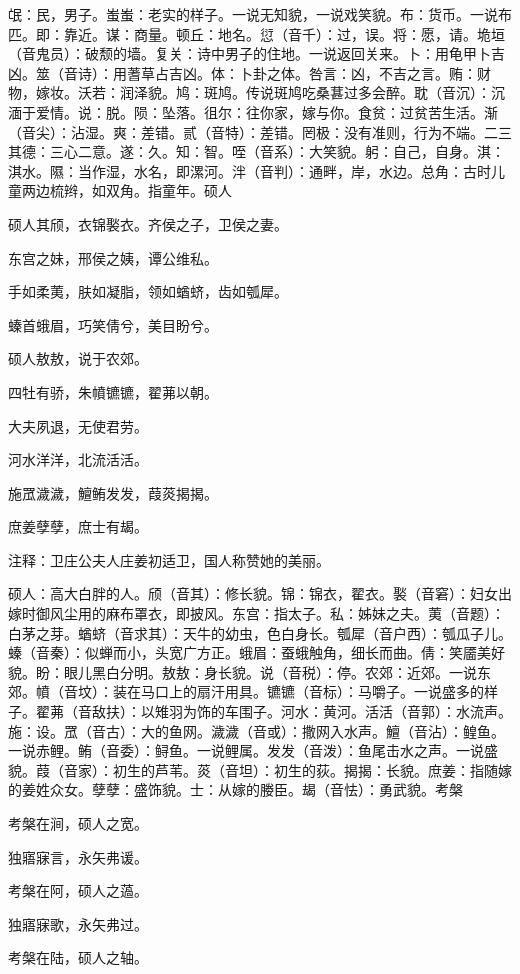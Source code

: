 \documentclass[12pt,UTF8]{ctexbook}
\begin{document}
氓：民，男子。蚩蚩：老实的样子。一说无知貌，一说戏笑貌。布：货币。一说布匹。即：靠近。谋：商量。顿丘：地名。愆（音千）：过，误。将：愿，请。垝垣（音鬼员）：破颓的墙。复关：诗中男子的住地。一说返回关来。卜：用龟甲卜吉凶。筮（音诗）：用蓍草占吉凶。体：卜卦之体。咎言：凶，不吉之言。贿：财物，嫁妆。沃若：润泽貌。鸠：斑鸠。传说斑鸠吃桑葚过多会醉。耽（音沉）：沉湎于爱情。说：脱。陨：坠落。徂尔：往你家，嫁与你。食贫：过贫苦生活。渐（音尖）：沾湿。爽：差错。贰（音特）：差错。罔极：没有准则，行为不端。二三其德：三心二意。遂：久。知：智。咥（音系）：大笑貌。躬：自己，自身。淇：淇水。隰：当作湿，水名，即漯河。泮（音判）：通畔，岸，水边。总角：古时儿童两边梳辫，如双角。指童年。硕人

硕人其颀，衣锦褧衣。齐侯之子，卫侯之妻。

东宫之妹，邢侯之姨，谭公维私。

手如柔荑，肤如凝脂，领如蝤蛴，齿如瓠犀。

螓首蛾眉，巧笑倩兮，美目盼兮。

硕人敖敖，说于农郊。

四牡有骄，朱幩镳镳，翟茀以朝。

大夫夙退，无使君劳。

河水洋洋，北流活活。

施罛濊濊，鱣鲔发发，葭菼揭揭。

庶姜孽孽，庶士有朅。

注释：卫庄公夫人庄姜初适卫，国人称赞她的美丽。

硕人：高大白胖的人。颀（音其）：修长貌。锦：锦衣，翟衣。褧（音窘）：妇女出嫁时御风尘用的麻布罩衣，即披风。东宫：指太子。私：姊妹之夫。荑（音题）：白茅之芽。蝤蛴（音求其）：天牛的幼虫，色白身长。瓠犀（音户西）：瓠瓜子儿。螓（音秦）：似蝉而小，头宽广方正。蛾眉：蚕蛾触角，细长而曲。倩：笑靥美好貌。盼：眼儿黑白分明。敖敖：身长貌。说（音税）：停。农郊：近郊。一说东郊。幩（音坟）：装在马口上的扇汗用具。镳镳（音标）：马嚼子。一说盛多的样子。翟茀（音敌扶）：以雉羽为饰的车围子。河水：黄河。活活（音郭）：水流声。施：设。罛（音古）：大的鱼网。濊濊（音或）：撒网入水声。鱣（音沾）：鳇鱼。一说赤鲤。鲔（音委）：鲟鱼。一说鲤属。发发（音泼）：鱼尾击水之声。一说盛貌。葭（音家）：初生的芦苇。菼（音坦）：初生的荻。揭揭：长貌。庶姜：指随嫁的姜姓众女。孽孽：盛饰貌。士：从嫁的媵臣。朅（音怯）：勇武貌。考槃

考槃在涧，硕人之宽。

独寤寐言，永矢弗谖。

考槃在阿，硕人之薖。

独寤寐歌，永矢弗过。

考槃在陆，硕人之轴。
\end{document}
